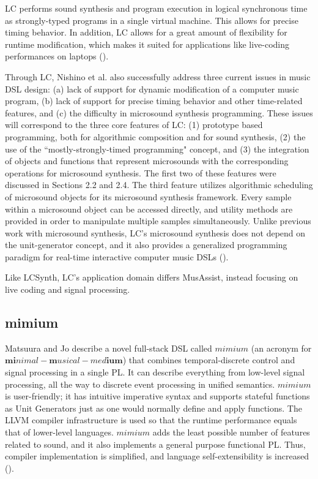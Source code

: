 \documentclass{report}
\newcommand\citeparen[1]{(\cite{#1})}
\begin{document}
LC performs sound synthesis and program execution in logical synchronous time as strongly-typed programs in a single virtual machine. This allows for precise timing behavior. In  addition, LC allows for a great amount  of flexibility for  runtime modification, which makes it suited for applications  like live-coding performances on laptops \citeparen{nishino_osaka_nakatsu_2013}.

Through LC, Nishino et al. also successfully address three current issues in music DSL design: (a) lack of support for  dynamic modification of a computer music program, (b) lack of  support  for  precise  timing behavior and other time-related features, and (c) the difficulty in microsound synthesis  programming. These  issues  will correspond to the three core features of  LC: (1) prototype based programming, both for algorithmic composition and for sound synthesis, (2) the use of the ``mostly-strongly-timed programming" concept, and  (3)  the integration of objects and  functions that represent microsounds  with the corresponding operations for microsound synthesis. The  first two of these features were discussed in Sections 2.2 and 2.4. The third feature utilizes algorithmic scheduling of microsound objects for  its microsound synthesis framework. Every sample within a  microsound  object can  be  accessed  directly, and utility methods are provided in order to manipulate   multiple samples simultaneously. Unlike  previous work with microsound synthesis, LC's microsound synthesis does not depend on the unit-generator concept, and  it  also provides a generalized programming paradigm for real-time interactive computer music DSLs \citeparen{nishino_osaka_nakatsu_2014}.

Like LCSynth, LC's application domain differs MusAssist, instead focusing on live coding and signal processing.

\subsection{mimium}

Matsuura and  Jo  describe a  novel full-stack DSL called  $mimium$ (an acronym for $\textbf{mi}nimal-\textbf{m}usical-med\textbf{ium}$) that  combines temporal-discrete control  and signal processing in a  single  PL. It  can describe everything from low-level signal processing, all the way to discrete  event processing  in unified semantics. $mimium$ is  user-friendly;  it has  intuitive  imperative  syntax and supports stateful functions as  Unit  Generators just  as one  would  normally define  and apply functions. The  LLVM compiler infrastructure is used so that the runtime performance equals  that of lower-level languages. $mimium$ adds the least possible  number of features related  to sound, and  it also implements a general purpose  functional PL. Thus, compiler implementation is simplified, and language self-extensibility is increased \citeparen{matsuura_jo_2021}.
\end{document}
